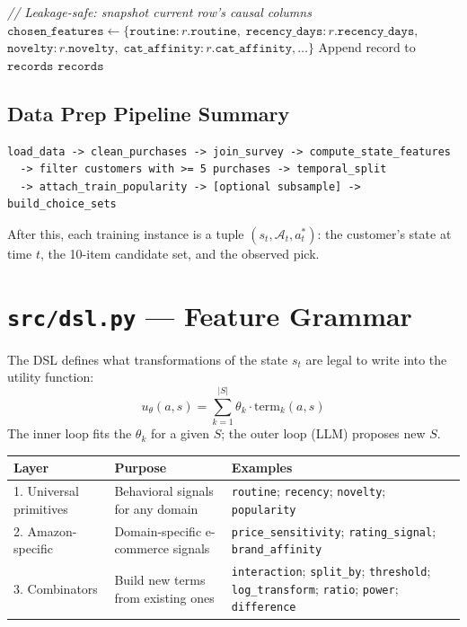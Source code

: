 \documentclass[11pt,a4paper]{article}
\begin{document}
\begin{algorithm}[H]
\begin{algorithmic}[1]
    \Statex \textit{// Leakage-safe: snapshot current row's causal columns}
    \State $\texttt{chosen\_features} \gets \{\texttt{routine}: r.\texttt{routine},\; \texttt{recency\_days}: r.\texttt{recency\_days},$
    \Statex \hspace{8em} $\texttt{novelty}: r.\texttt{novelty},\; \texttt{cat\_affinity}: r.\texttt{cat\_affinity}, \ldots\}$
    \State Append record to $\texttt{records}$
\EndFor
\State \Return $\texttt{records}$
\end{algorithmic}
\end{algorithm}

\subsection{Data Prep Pipeline Summary}

\begin{lstlisting}[frame=none,backgroundcolor=\color{white}]
load_data -> clean_purchases -> join_survey -> compute_state_features
  -> filter customers with >= 5 purchases -> temporal_split
  -> attach_train_popularity -> [optional subsample] -> build_choice_sets
\end{lstlisting}

After this, each training instance is a tuple $(s_t, \mathcal{A}_t, a^*_t)$: the customer's state at time $t$, the 10-item candidate set, and the observed pick.

\section{\texttt{src/dsl.py} --- Feature Grammar}
\label{sec:dsl}

The DSL defines what transformations of the state $s_t$ are legal to write into the utility function:
\[
u_\theta(a, s) = \sum_{k=1}^{|S|} \theta_k \cdot \text{term}_k(a, s)
\]
The inner loop fits the $\theta_k$ for a given $S$; the outer loop (LLM) proposes new $S$.

\begin{table}[H]\centering\tiny
\begin{tabularx}{\textwidth}{lXX}
\toprule
\textbf{Layer} & \textbf{Purpose} & \textbf{Examples} \\
\midrule
1. Universal primitives & Behavioral signals for any domain & \texttt{routine}; \texttt{recency}; \texttt{novelty}; \texttt{popularity} \\
2. Amazon-specific & Domain-specific e-commerce signals & \texttt{price\_sensitivity}; \texttt{rating\_signal}; \texttt{brand\_affinity} \\
3. Combinators & Build new terms from existing ones & \texttt{interaction}; \texttt{split\_by}; \texttt{threshold}; \texttt{log\_transform}; \texttt{ratio}; \texttt{power}; \texttt{difference} \\
\bottomrule
\end{tabularx}
\end{table}
\end{document}
